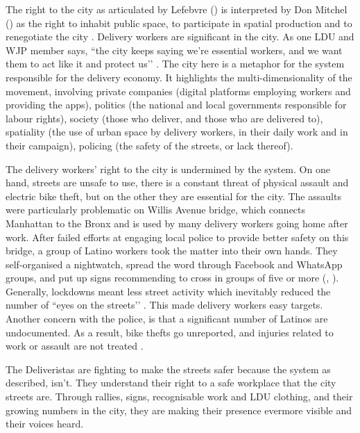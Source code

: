 \documentclass{article}
\begin{document}
The right to the city as articulated by Lefebvre (\citeyear{lefebvre1995writings}) is interpreted by Don Mitchel (\citeyear{mitchell2003right}) as the right to inhabit public space, to participate in spatial production and to renegotiate the city \parencite{lee2018delivering}. Delivery workers are significant in the city. As one LDU and WJP member says, ``the city keeps saying we’re essential workers, and we want them to act like it and protect us’’ \parencite{ldutestimonials}. The city here is a metaphor for the system responsible for the delivery economy. It highlights the multi-dimensionality of the movement, involving private companies (digital platforms employing workers and providing the apps), politics (the national and local governments responsible for labour rights), society (those who deliver, and those who are delivered to), spatiality (the use of urban space by delivery workers, in their daily work and in their campaign), policing (the safety of the streets, or lack thereof).

The delivery workers’ right to the city is undermined by the system. On one hand, streets are unsafe to use, there is a constant threat of physical assault and electric bike theft, but on the other they are essential for the city. 
The assaults were particularly problematic on Willis Avenue bridge, which connects Manhattan to the Bronx and is used by many delivery workers going home after work. After failed efforts at engaging local police to provide better safety on this bridge, a group of Latino workers took the matter into their own hands. They self-organised a nightwatch, spread the word through Facebook and WhatsApp groups, and put up signs recommending to cross in groups of five or more (\parencite{vox2021}, \parencite{curbed2021}). 
Generally, lockdowns meant less street activity which inevitably reduced the number of ``eyes on the streets’’ \parencite{jacobs2007uses}. This made delivery workers easy targets.
Another concern with the police, is that a significant number of Latinos are undocumented. As a result, bike thefts go unreported, and injuries related to work or assault are not treated \parencite{brictv}.

The Deliveristas are fighting to make the streets safer because the system as described, isn't. They understand their right to a safe workplace that the city streets are. Through rallies, signs, recognisable work and LDU clothing, and their growing numbers in the city, they are making their presence evermore visible and their voices heard.
\end{document}
